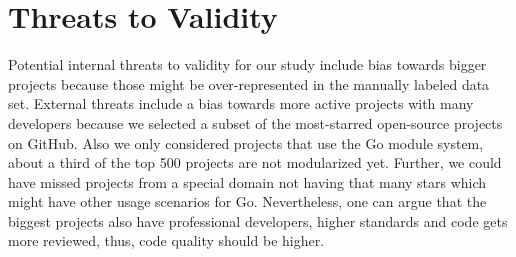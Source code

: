 \section{Threats to Validity}
\label{sec:threatsToValidity}



Potential internal threats to validity for our study include bias towards bigger projects because those might be over-represented in the manually labeled data set. 
External threats include a bias towards more active projects with many developers because we selected a subset of the most-starred open-source projects on GitHub. 
Also we only considered projects that use the Go module system, about a third of the top 500 projects are not modularized yet.
Further, we could have missed projects from a special domain not having that many stars which might have other usage scenarios for \unsafe{} Go.
Nevertheless, one can argue that the biggest projects also have professional developers, higher standards and code gets more reviewed, thus, code quality should be higher.

